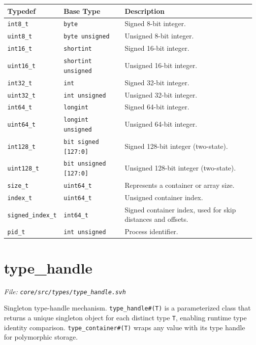\documentclass[11pt,letterpaper]{report}
\begin{document}
\begin{xltabular}{\linewidth}{>{\small}p{1.5in} >{\small}p{1.5in} >{\small}X}
\toprule
\textbf{Typedef} & \textbf{Base Type} & \textbf{Description} \\
\midrule
\endhead
\bottomrule
\endfoot
\texttt{int8\_t} & \texttt{byte} & Signed 8-bit integer. \\
\texttt{uint8\_t} & \texttt{byte unsigned} & Unsigned 8-bit integer. \\
\texttt{int16\_t} & \texttt{shortint} & Signed 16-bit integer. \\
\texttt{uint16\_t} & \texttt{shortint unsigned} & Unsigned 16-bit integer. \\
\texttt{int32\_t} & \texttt{int} & Signed 32-bit integer. \\
\texttt{uint32\_t} & \texttt{int unsigned} & Unsigned 32-bit integer. \\
\texttt{int64\_t} & \texttt{longint} & Signed 64-bit integer. \\
\texttt{uint64\_t} & \texttt{longint unsigned} & Unsigned 64-bit integer. \\
\texttt{int128\_t} & \texttt{bit signed [127:0]} & Signed 128-bit integer (two-state). \\
\texttt{uint128\_t} & \texttt{bit unsigned [127:0]} & Unsigned 128-bit integer (two-state). \\
\texttt{size\_t} & \texttt{uint64\_t} & Represents a container or array size. \\
\texttt{index\_t} & \texttt{uint64\_t} & Unsigned container index. \\
\texttt{signed\_index\_t} & \texttt{int64\_t} & Signed container index, used for skip distances and offsets. \\
\texttt{pid\_t} & \texttt{int unsigned} & Process identifier. \\
\end{xltabular}

\section{type\_handle}
\noindent\small\textit{File: \texttt{core/src/types/type\_handle.svh}}\par

Singleton type-handle mechanism. \texttt{type\_handle\#(T)} is a parameterized class that returns a unique singleton object for each distinct type \texttt{T}, enabling runtime type identity comparison. \texttt{type\_container\#(T)} wraps any value with its type handle for polymorphic storage.
\end{document}
